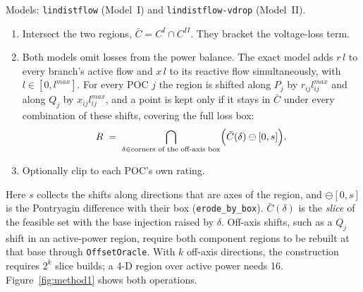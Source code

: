 \documentclass[11pt,a4paper]{report}
\newcommand{\code}[1]{\texttt{\small #1}}
\begin{document}
Models: \code{lindistflow} (Model~I) and \code{lindistflow-vdrop} (Model~II).

\begin{enumerate}
\item Intersect the two regions, $\bar{C} = C^{I} \cap C^{II}$. They bracket
  the voltage-loss term.
\item Both models omit losses from the power balance. The exact model
  adds $r\,l$ to every branch's active flow and $x\,l$ to its reactive
  flow simultaneously, with $l \in [0, l^{max}]$. For every POC $j$
  the region is shifted along $P_j$ by $r_{ij} l^{max}_{ij}$ and along $Q_j$
  by $x_{ij} l^{max}_{ij}$, and a point is kept only if it stays in $\bar{C}$
  under every combination of these shifts, covering the full loss box:
  \begin{equation}
  R \;=\; \bigcap_{\delta \in \text{corners of the off-axis box}}
    \Bigl( \bar{C}(\delta) \ominus [0, s] \Bigr).
  \end{equation}
\item Optionally clip to each POC's own rating.
\end{enumerate}

Here $s$ collects the shifts along directions that are axes of the region,
and $\ominus [0, s]$ is the Pontryagin difference with their box
(\code{erode\_by\_box}). $\bar{C}(\delta)$ is the \emph{slice} of the feasible
set with the base injection raised by $\delta$. Off-axis shifts, such as a
$Q_j$ shift in an active-power region, require both component regions to be
rebuilt at that base through \code{OffsetOracle}. With $k$ off-axis directions,
the construction requires $2^k$ slice builds; a 4-D region over active power
needs 16. Figure~\ref{fig:method1}
shows both operations.
\end{document}
